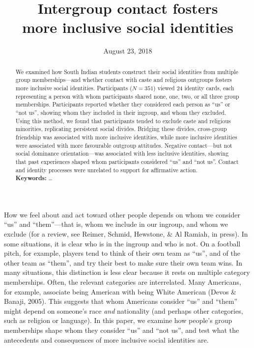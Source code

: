 \documentclass[12pt, a4paper]{article}
\title{Intergroup contact fosters\\more inclusive social identities}
\date{August 23, 2018}
\begin{document}
\maketitle

\begin{abstract}
\noindent We examined how South Indian students construct their social identities from multiple group memberships---and whether contact with caste and religious outgroups fosters more inclusive social identities. Participants ($N = 351$) viewed 24 identity cards, each representing a person with whom participants shared none, one, two, or all three group memberships. Participants reported whether they considered each person as ``us'' or ``not us'', showing whom they included in their ingroup, and whom they excluded. Using this method, we found that participants tended to exclude caste and religious minorities, replicating persistent social divides. Bridging these divides, cross-group friendship was associated with more inclusive identities, while more inclusive identities were associated with more favourable outgroup attitudes. Negative contact---but not social dominance orientation---was associated with less inclusive identities, showing that past experiences shaped whom participants considered ``us'' and ``not us''. Contact and identity processes were unrelated to support for affirmative action.\\[1ex]
\noindent \textbf{Keywords:} \ldots\\[1ex]
\end{abstract}

\linenumbers

\noindent How we feel about and act toward other people depends on whom we consider ``us'' and ``them''---that is, whom we include in our ingroup, and whom we exclude (for a review, see Reimer, Schmid, Hewstone, \& Al Ramiah, in press). In some situations, it is clear who is in the ingroup and who is not. On a football pitch, for example, players tend to think of their own team as ``us'', and of the other team as ``them'', and try their best to make sure their own team wins. In many situations, this distinction is less clear because it rests on multiple category memberships. Often, the relevant categories are interrelated. Many Americans, for example, associate being American with being White American (Devos \& Banaji, 2005). This suggests that whom Americans consider ``us'' and ``them'' might depend on someone's race \emph{and} nationality (and perhaps other categories, such as religion or language). In this paper, we examine how people's group memberships shape whom they consider ``us'' and ``not us'', and test what the antecedents and consequences of more inclusive social identities are.
\end{document}
